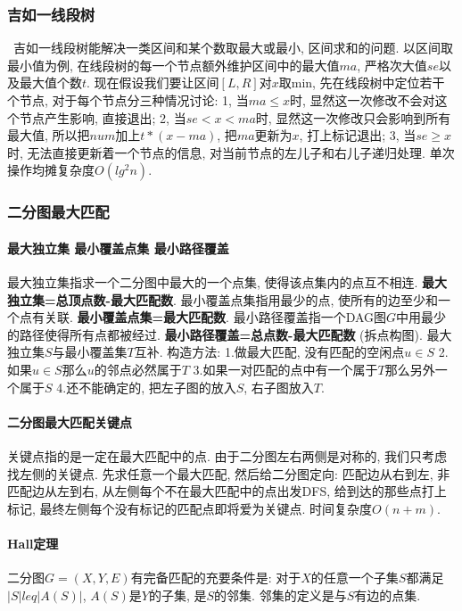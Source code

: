 \subsubsection{吉如一线段树}\
        吉如一线段树能解决一类区间和某个数取最大或最小, 区间求和的问题. 以区间取最小值为例, 在线段树的每一个节点额外维护区间中的最大值$ma$, 严格次大值$se$以及最大值个数$t$. 现在假设我们要让区间$[L,R]$对$x$取min, 先在线段树中定位若干个节点, 对于每个节点分三种情况讨论: 1, 当$ma\leq x$时, 显然这一次修改不会对这个节点产生影响, 直接退出; 2, 当$se<x<ma$时, 显然这一次修改只会影响到所有最大值, 所以把$num$加上$t*(x-ma)$, 把$ma$更新为$x$, 打上标记退出; 3, 当$se\geq x$时, 无法直接更新着一个节点的信息, 对当前节点的左儿子和右儿子递归处理. 单次操作均摊复杂度$O(lg^2n)$. 

\subsubsection{二分图最大匹配}
        \paragraph{最大独立集 最小覆盖点集 最小路径覆盖} 最大独立集指求一个二分图中最大的一个点集, 使得该点集内的点互不相连. \textbf{最大独立集=总顶点数-最大匹配数}. 最小覆盖点集指用最少的点, 使所有的边至少和一个点有关联. \textbf{最小覆盖点集=最大匹配数}. 最小路径覆盖指一个DAG图$G$中用最少的路径使得所有点都被经过. \textbf{最小路径覆盖=总点数-最大匹配数} (拆点构图). 最大独立集$S$与最小覆盖集$T$互补. 构造方法: 1.做最大匹配, 没有匹配的空闲点$u\in S$ 2.如果$u\in S$那么$u$的邻点必然属于$T$ 3.如果一对匹配的点中有一个属于$T$那么另外一个属于$S$ 4.还不能确定的, 把左子图的放入$S$, 右子图放入$T$.
        \paragraph{二分图最大匹配关键点} 关键点指的是一定在最大匹配中的点. 由于二分图左右两侧是对称的, 我们只考虑找左侧的关键点. 先求任意一个最大匹配, 然后给二分图定向: 匹配边从右到左, 非匹配边从左到右, 从左侧每个不在最大匹配中的点出发DFS, 给到达的那些点打上标记, 最终左侧每个没有标记的匹配点即将爱为关键点. 时间复杂度$O(n+m)$. 
        \paragraph{Hall定理}二分图$G=(X,Y,E)$有完备匹配的充要条件是: 对于$X$的任意一个子集$S$都满足$|S|leq |A(S)|$, $A(S)$是$Y$的子集, 是$S$的邻集. 邻集的定义是与$S$有边的点集. 

